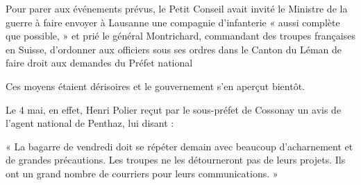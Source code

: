 \documentclass[french,twoside]{book} %
\newenvironment{quoteblock}%
  {\begin{quoting}}
  {\end{quoting}}
\newenvironment{quotebar}{%
    \def\FrameCommand{{\color{rubric!10!}\vrule width 0.5em} \hspace{0.9em}}%
    \def\OuterFrameSep{\itemsep} %
    \MakeFramed {\advance\hsize-\width \FrameRestore}
  }%
  {%
    \endMakeFramed
  }
\renewenvironment{quoteblock}%
  {%
    \savenotes
    \setstretch{0.9}
    \begin{quotebar}
  }
  {%
    \end{quotebar}
    \spewnotes
  }
\begin{document}
\noindent Pour parer aux événements prévus, le Petit Conseil avait invité le Ministre de la guerre à faire envoyer à Lausanne une compagnie d’infanterie « aussi complète que possible, » et prié le général Montrichard, commandant des troupes françaises en Suisse, d’ordonner aux officiers sous ses ordres dans le Canton du Léman de faire droit aux demandes du Préfet national\par
Ces moyens étaient dérisoires et le gouvernement s’en aperçut bientôt.\par
Le 4 mai, en effet, Henri Polier reçut par le sous-préfet de Cossonay un avis de l’agent national de Penthaz, lui disant :\par

\begin{quoteblock}
 \noindent « La bagarre de vendredi doit se répéter demain avec beaucoup d’acharnement et de grandes précautions. Les troupes ne les détourneront pas de leurs projets. Ils ont un grand nombre de courriers pour leurs communications. »
 \end{quoteblock}
\end{document}

